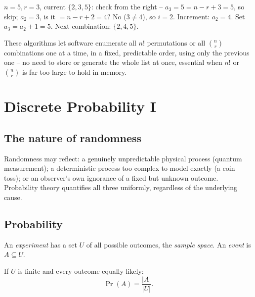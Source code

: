 \documentclass[11pt]{article}
\begin{document}
\begin{example}
$n=5,r=3$, current $\{2,3,5\}$: check from the right -- $a_3=5=n-r+3=5$, so skip; $a_2=3$, is it $=n-r+2=4$? No ($3\neq4$), so $i=2$. Increment: $a_2=4$. Set $a_3=a_2+1=5$. Next combination: $\{2,4,5\}$.
\end{example}

\begin{note}
These algorithms let software enumerate all $n!$ permutations or all $\binom nr$ combinations one at a time, in a fixed, predictable order, using only the previous one -- no need to store or generate the whole list at once, essential when $n!$ or $\binom nr$ is far too large to hold in memory.
\end{note}

\newpage
\section{Discrete Probability I}

\subsection{The nature of randomness}
\label{sec:9-1}

\begin{note}
Randomness may reflect: a genuinely unpredictable physical process (quantum measurement); a deterministic process too complex to model exactly (a coin toss); or an observer's own ignorance of a fixed but unknown outcome. Probability theory quantifies all three uniformly, regardless of the underlying cause.
\end{note}

\subsection{Probability}
\label{sec:9-2}

\begin{definition}
An \emph{experiment} has a set $U$ of all possible outcomes, the \emph{sample space}. An \emph{event} is $A\subseteq U$.
\end{definition}

\begin{definition}
If $U$ is finite and every outcome equally likely:
\[
\Pr(A) = \frac{|A|}{|U|}.
\]
\end{definition}
\end{document}
